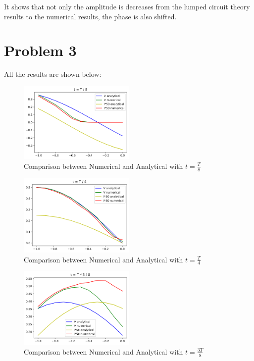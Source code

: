 \documentclass{article}
\begin{document}
        It shows that not only the amplitude is decreases from the lumped circuit theory results to the numerical results, the phase is also shifted.

\section{Problem 3}

    All the results are shown below:

    \begin{figure}[H]
        \centering
        \includegraphics[width=0.5\textwidth]{img/3_1.png}
        \caption{Comparison between Numerical and Analytical with $t = \frac{T}{8}$}
        \label{fig:3-1}
    \end{figure}

    \begin{figure}[H]
        \centering
        \includegraphics[width=0.5\textwidth]{img/3_2.png}
        \caption{Comparison between Numerical and Analytical with $t = \frac{T}{4}$}
        \label{fig:3-2}
    \end{figure}

    \begin{figure}[H]
        \centering
        \includegraphics[width=0.5\textwidth]{img/3_3.png}
        \caption{Comparison between Numerical and Analytical with $t = \frac{3T}{8}$}
        \label{fig:3-3}
    \end{figure}
\end{document}
